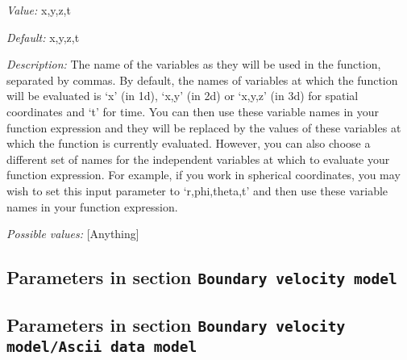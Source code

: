 \begin{itemize}
{\it Value:} x,y,z,t


{\it Default:} x,y,z,t


{\it Description:} The name of the variables as they will be used in the function, separated by commas. By default, the names of variables at which the function will be evaluated is `x' (in 1d), `x,y' (in 2d) or `x,y,z' (in 3d) for spatial coordinates and `t' for time. You can then use these variable names in your function expression and they will be replaced by the values of these variables at which the function is currently evaluated. However, you can also choose a different set of names for the independent variables at which to evaluate your function expression. For example, if you work in spherical coordinates, you may wish to set this input parameter to `r,phi,theta,t' and then use these variable names in your function expression.


{\it Possible values:} [Anything]
\end{itemize}

\subsection{Parameters in section \tt Boundary velocity model}
\label{parameters:Boundary_20velocity_20model}


\subsection{Parameters in section \tt Boundary velocity model/Ascii data model}
\label{parameters:Boundary_20velocity_20model/Ascii_20data_20model}

